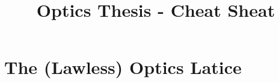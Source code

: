 \documentclass{report}
\title{Optics Thesis - Cheat Sheat}
\begin{document}
\maketitle

\chapter{The (Lawless) Optics Latice}


\end{document}
